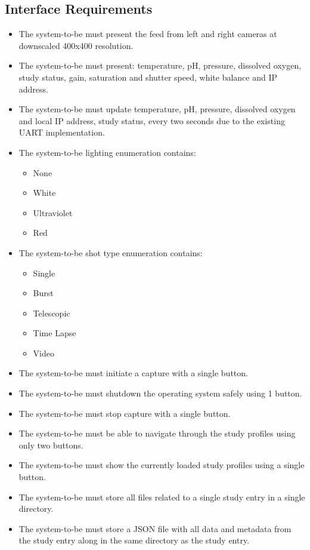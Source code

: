 \subsection{Interface Requirements}
\begin{itemize}
	\item The system-to-be must present the feed from left and right cameras at downscaled 400x400 resolution.
	\item The system-to-be must present: temperature, pH, pressure, dissolved oxygen, study status, gain, saturation and shutter speed, white balance and IP address.
	\item The system-to-be must update temperature, pH, pressure, dissolved oxygen and local IP address, study status, every two seconds due to the existing UART implementation.
	\item The system-to-be lighting enumeration contains:
	      \begin{itemize}
		      \item None
		      \item White
		      \item Ultraviolet
		      \item Red
	      \end{itemize}
	\item The system-to-be shot type enumeration contains:
	      \begin{itemize}
		      \item Single
		      \item Burst
		      \item Telescopic
		      \item Time Lapse
		      \item Video
	      \end{itemize}
	\item The system-to-be must initiate a capture with a single button.
	\item The system-to-be must shutdown the operating system safely using 1 button.
	\item The system-to-be must stop capture with a single button.
	\item The system-to-be must be able to navigate through the study profiles using only two buttons.
	\item The system-to-be must show the currently loaded study profiles using a single button.
	\item The system-to-be must store all files related to a single study entry in a single directory.
	\item The system-to-be must store a JSON file with all data and metadata from the study entry along in the same directory as the study entry.

\end{itemize}
